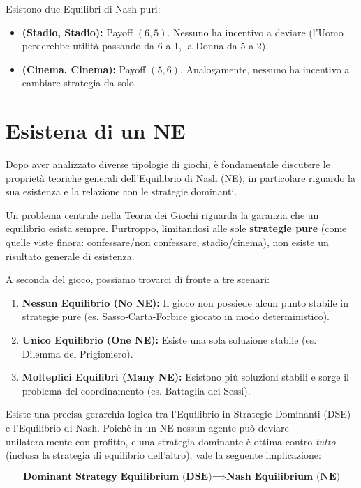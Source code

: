 \begin{description}
    Esistono due Equilibri di Nash puri:
    \begin{itemize}
        \item \textbf{(Stadio, Stadio):} Payoff $(6, 5)$. Nessuno ha incentivo a deviare (l'Uomo perderebbe utilità passando da 6 a 1, la Donna da 5 a 2).
        \item \textbf{(Cinema, Cinema):} Payoff $(5, 6)$. Analogamente, nessuno ha incentivo a cambiare strategia da solo.
    \end{itemize}
\end{description}

\section{Esistena di un NE}

Dopo aver analizzato diverse tipologie di giochi, è fondamentale discutere le proprietà teoriche generali dell'Equilibrio di Nash (NE), in particolare riguardo la sua esistenza e la relazione con le strategie dominanti.

Un problema centrale nella Teoria dei Giochi riguarda la garanzia che un equilibrio esista sempre.
Purtroppo, limitandosi alle sole \textbf{strategie pure} (come quelle viste finora: confessare/non confessare, stadio/cinema), non esiste un risultato generale di esistenza.

A seconda del gioco, possiamo trovarci di fronte a tre scenari:
\begin{enumerate}
    \item \textbf{Nessun Equilibrio (No NE):} Il gioco non possiede alcun punto stabile in strategie pure (es. Sasso-Carta-Forbice giocato in modo deterministico).
    \item \textbf{Unico Equilibrio (One NE):} Esiste una sola soluzione stabile (es. Dilemma del Prigioniero).
    \item \textbf{Molteplici Equilibri (Many NE):} Esistono più soluzioni stabili e sorge il problema del coordinamento (es. Battaglia dei Sessi).
\end{enumerate}

Esiste una precisa gerarchia logica tra l'Equilibrio in Strategie Dominanti (DSE) e l'Equilibrio di Nash. Poiché in un NE nessun agente può deviare unilateralmente con profitto, e una strategia dominante è ottima contro \textit{tutto} (inclusa la strategia di equilibrio dell'altro), vale la seguente implicazione:

\[
\textbf{Dominant Strategy Equilibrium (DSE)} \implies \textbf{Nash Equilibrium (NE)}
\]


